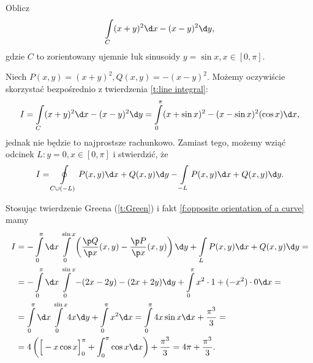 \begin{example}
    Oblicz
    \[ \int\limits_C (x + y)^2 \d x - (x - y)^2 \d y, \]
    gdzie $C$ to zorientowany ujemnie łuk sinusoidy $y = \sin x, x \in [0, \pi]$.
\end{example}
\begin{solution}
    Niech $P(x, y) = (x + y)^2, Q(x, y) = -(x - y)^2$. Możemy oczywiście skorzystać bezpośrednio z twierdzenia \ref{t:line integral}:
    \[ I = \int\limits_C (x + y)^2 \d x - (x - y)^2 \d y = \int\limits_0^\pi (x + \sin x)^2 - (x - \sin x)^2(\cos x) \d x, \]
    jednak nie będzie to najprostsze rachunkowo. Zamiast tego, możemy wziąć odcinek $L : y = 0, x \in [0, \pi]$ i stwierdzić, że
    \[ I = \oint\limits_{C \cup (-L)} P(x, y) \d x + Q(x, y) \d y - \int\limits_{-L} P(x, y) \d x + Q(x, y) \d y. \]
    \begin{center}
    \end{center}
    Stosując twierdzenie Greena (\ref{t:Green}) i fakt \ref{f:opposite orientation of a curve} mamy
    \begin{align*}
        I &= -\int\limits_0^\pi \d x \int\limits_0^{\sin x} \left(\frac{\p Q}{\p x}(x, y) - \frac{\p P}{\p x}(x, y)\right) \d y + \int\limits_L P(x, y) \d x + Q(x, y) \d y = \\
        &= -\int\limits_0^\pi \d x \int\limits_0^{\sin x} -(2x - 2y) - (2x + 2y) \d y + \int\limits_0^\pi x^2 \cdot 1 + (-x^2) \cdot 0 \d x = \\
        &= \int\limits_0^\pi \d x \int\limits_0^{\sin x} 4x \d y + \int\limits_0^\pi x^2 \d x = \int\limits_0^\pi 4x\sin x \d x + \frac{\pi^3}{3} = \\
        &= 4\left(\Big[-x\cos x\Big]_0^\pi + \int_0^\pi \cos x \d x\right) + \frac{\pi^3}{3} = 4\pi + \frac{\pi^3}{3}.
    \end{align*}
\end{solution}

